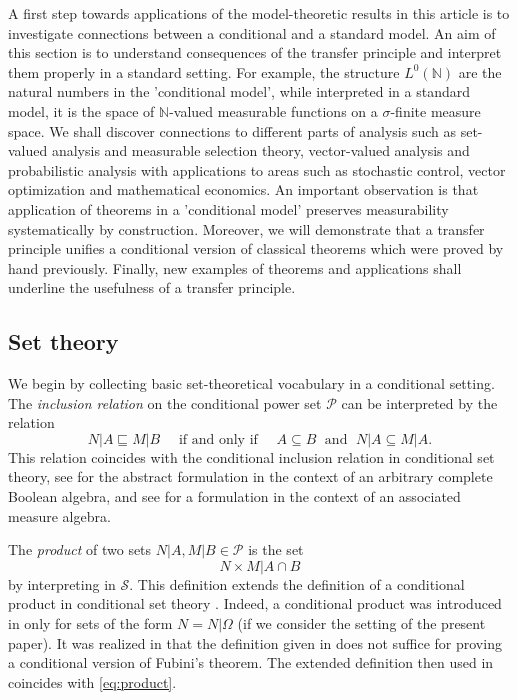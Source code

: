 \documentclass{jloganal}
\numberwithin{equation}{section}
\theoremstyle{plain}
\newcommand\N{\mathbb{N}}
\begin{document}
A first step towards applications of the model-theoretic results in this article is to investigate connections between a conditional and a standard model. 
An aim of this section is to understand consequences of the transfer principle and interpret them properly in a standard setting. 
For example, the structure $L^0(\N)$ are the natural numbers in the 'conditional model', while interpreted in a standard model, it is the space of $\N$-valued measurable functions on a $\sigma$-finite measure space.  
We shall discover connections to different parts of analysis such as set-valued analysis and measurable selection theory, vector-valued analysis and probabilistic analysis with applications to areas such as stochastic control, vector optimization and mathematical economics. 
An important observation is that application of theorems in a 'conditional model' preserves measurability systematically by construction.   
Moreover, we will demonstrate that a transfer principle unifies a conditional version of classical theorems which were proved by hand previously.  Finally, 
new examples of theorems and applications shall underline the usefulness of a transfer principle.  


\subsection{Set theory}

We begin by collecting basic set-theoretical vocabulary in a conditional setting.
The  \emph{inclusion relation} \cite[Definition II.3.1]{simpson2009subsystems} on the conditional power set $\mathcal{P}$ can be interpreted by the relation 
\begin{equation}\label{eq:inclusion}
N|A\sqsubseteq M|B \quad \text{ if and only if }\quad A\subseteq B\;\text{ and } \;N|A\subseteq M|A. 
\end{equation}
This relation coincides with the conditional inclusion relation in conditional set theory, see \cite[Definition 2.8]{drapeau2016algebra} for the abstract formulation in the context of an arbitrary complete Boolean algebra, and see \cite[Definition 2.5]{jamneshan2017measures} for a formulation in the context of an associated measure algebra. 

The \emph{product} of two sets $N|A,M|B\in\mathcal{P}$ is the set 
\begin{equation}\label{eq:product}
N\times M|A\cap B
\end{equation}
by interpreting \cite[Definition II.3.1]{simpson2009subsystems} in $\mathcal{S}$.   
This definition extends the definition of a conditional product in conditional set theory \cite[Definition  2.14]{drapeau2016algebra}.  
Indeed, a conditional product was introduced in \cite{drapeau2016algebra} only for sets of the form $N=N|\Omega$ (if we consider the setting of the present paper).  
It was realized in \cite{jamneshan2017measures} that the definition given in \cite{drapeau2016algebra} does not suffice for proving a conditional version of Fubini's theorem.  
The extended definition then used in \cite[Section 5.1]{jamneshan2017measures} coincides with \eqref{eq:product}. 
\end{document}
